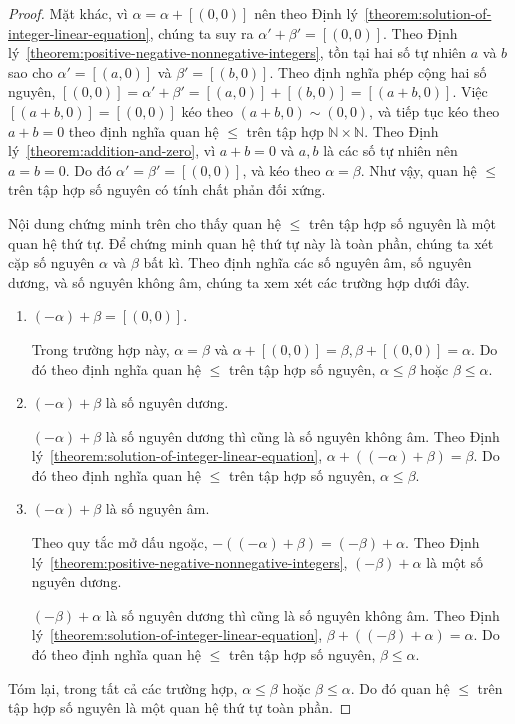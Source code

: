 \begin{proof}
	Mặt khác, vì $\alpha = \alpha + [(0,0)]$ nên theo Định lý~\ref{theorem:solution-of-integer-linear-equation}, chúng ta suy ra $\alpha' + \beta' = [(0,0)]$. Theo Định lý~\ref{theorem:positive-negative-nonnegative-integers}, tồn tại hai số tự nhiên $a$ và $b$ sao cho $\alpha' = [(a, 0)]$ và $\beta' = [(b, 0)]$. Theo định nghĩa phép cộng hai số nguyên, $[(0, 0)] = \alpha' + \beta' = [(a, 0)] + [(b, 0)] = [(a+b, 0)]$. Việc $[(a+b, 0)] = [(0,0)]$ kéo theo $(a+b, 0)\sim (0,0)$, và tiếp tục kéo theo $a + b = 0$ theo định nghĩa quan hệ $\leq$ trên tập hợp $\mathbb{N}\times\mathbb{N}$. Theo Định lý~\ref{theorem:addition-and-zero}, vì $a + b = 0$ và $a, b$ là các số tự nhiên nên $a = b = 0$. Do đó $\alpha' = \beta' = [(0, 0)]$, và kéo theo $\alpha = \beta$. Như vậy, quan hệ $\leq$ trên tập hợp số nguyên có tính chất phản đối xứng.

	Nội dung chứng minh trên cho thấy quan hệ $\leq$ trên tập hợp số nguyên là một quan hệ thứ tự. Để chứng minh quan hệ thứ tự này là toàn phần, chúng ta xét cặp số nguyên $\alpha$ và $\beta$ bất kì. Theo định nghĩa các số nguyên âm, số nguyên dương, và số nguyên không âm, chúng ta xem xét các trường hợp dưới đây.
	\begin{enumerate}[label={\textbf{Trường hợp \arabic*.}},itemindent=2cm]
		\item $(-\alpha) + \beta = [(0,0)]$.

		      Trong trường hợp này, $\alpha = \beta$ và $\alpha + [(0,0)] = \beta, \beta + [(0, 0)] = \alpha$. Do đó theo định nghĩa quan hệ $\leq$ trên tập hợp số nguyên, $\alpha\leq\beta$ hoặc $\beta\leq\alpha$.
		\item $(-\alpha) + \beta $ là số nguyên dương.

		      $(-\alpha) + \beta $ là số nguyên dương thì cũng là số nguyên không âm. Theo Định lý~\ref{theorem:solution-of-integer-linear-equation}, $\alpha + ((-\alpha) + \beta) = \beta$. Do đó theo định nghĩa quan hệ $\leq$ trên tập hợp số nguyên, $\alpha\leq\beta$.
		\item $(-\alpha) + \beta $ là số nguyên âm.

		      Theo quy tắc mở dấu ngoặc, $-((-\alpha) + \beta) = (-\beta) + \alpha$. Theo Định lý~\ref{theorem:positive-negative-nonnegative-integers}, $(-\beta) + \alpha$ là một số nguyên dương.

		      $(-\beta) + \alpha$ là số nguyên dương thì cũng là số nguyên không âm. Theo Định lý~\ref{theorem:solution-of-integer-linear-equation}, $\beta + ((-\beta) + \alpha) = \alpha$. Do đó theo định nghĩa quan hệ $\leq$ trên tập hợp số nguyên, $\beta\leq\alpha$.
	\end{enumerate}

	Tóm lại, trong tất cả các trường hợp, $\alpha\leq\beta$ hoặc $\beta\leq\alpha$. Do đó quan hệ $\leq$ trên tập hợp số nguyên là một quan hệ thứ tự toàn phần.
\end{proof}

